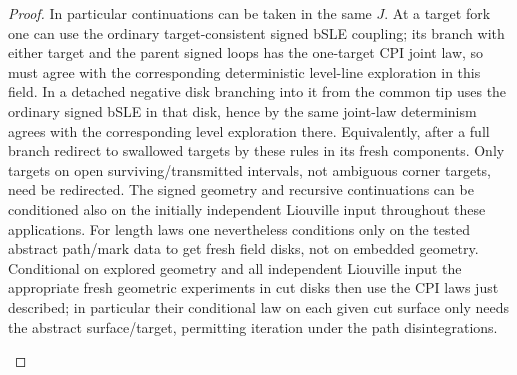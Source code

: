 \begin{proof}
In particular continuations can be taken in the same \(J\).
At a target fork one can use the ordinary target-consistent signed bSLE coupling; its branch with either target and the parent signed loops has the one-target CPI joint law, so must agree with the corresponding deterministic level-line exploration in this field.
In a detached negative disk branching into it from the common tip uses the ordinary signed bSLE in that disk, hence by the same joint-law determinism agrees with the corresponding level exploration there.
Equivalently, after a full branch redirect to swallowed targets by these rules in its fresh components.
Only targets on open surviving/transmitted intervals, not ambiguous corner targets, need be redirected.
The signed geometry and recursive continuations can be conditioned also on the initially independent Liouville input throughout these applications.
For length laws one nevertheless conditions only on the tested abstract path/mark data to get fresh field disks, not on embedded geometry.
Conditional on explored geometry and all independent Liouville input the appropriate fresh geometric experiments in cut disks then use the CPI laws just described; in particular their conditional law on each given cut surface only needs the abstract surface/target, permitting iteration under the path disintegrations. \citep[Proposition~5.3]{MSWTrunk}

\label{cut:prescribed-target-covariance}


\end{proof}
